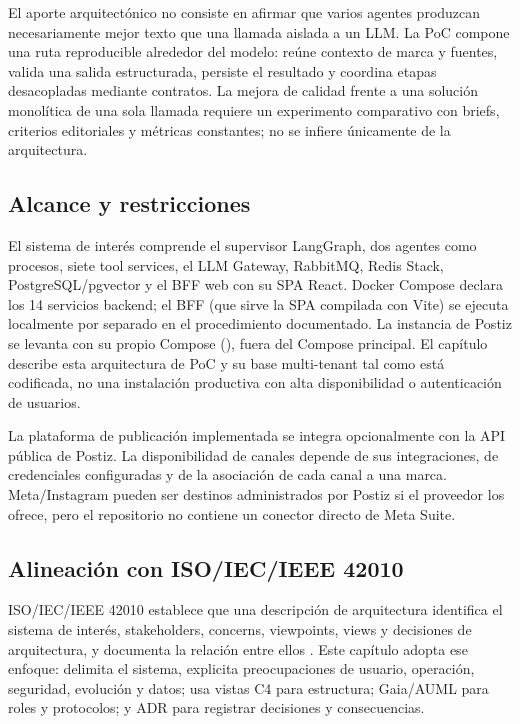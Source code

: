\documentclass[12pt,oneside]{report}
\newcommand{\code}[1]{\texttt{\detokenize{#1}}}
\begin{document}
El aporte arquitectónico no consiste en afirmar que varios agentes produzcan necesariamente mejor texto que una llamada aislada a un LLM. La PoC compone una ruta reproducible alrededor del modelo: reúne contexto de marca y fuentes, valida una salida estructurada, persiste el resultado y coordina etapas desacopladas mediante contratos. La mejora de calidad frente a una solución monolítica de una sola llamada requiere un experimento comparativo con briefs, criterios editoriales y métricas constantes; no se infiere únicamente de la arquitectura.

\subsection{Alcance y restricciones}
El sistema de interés comprende el supervisor LangGraph, dos agentes como procesos, siete tool services, el LLM Gateway, RabbitMQ, Redis Stack, PostgreSQL/pgvector y el BFF web con su SPA React. Docker Compose declara los 14 servicios backend; el BFF (que sirve la SPA compilada con Vite) se ejecuta localmente por separado en el procedimiento documentado. La instancia de Postiz se levanta con su propio Compose (\code{postiz/postiz-docker-compose}), fuera del Compose principal. El capítulo describe esta arquitectura de PoC y su base multi-tenant tal como está codificada, no una instalación productiva con alta disponibilidad o autenticación de usuarios.

La plataforma de publicación implementada se integra opcionalmente con la API pública de Postiz. La disponibilidad de canales depende de sus integraciones, de credenciales configuradas y de la asociación de cada canal a una marca. Meta/Instagram pueden ser destinos administrados por Postiz si el proveedor los ofrece, pero el repositorio no contiene un conector directo de Meta Suite.

\subsection{Alineación con ISO/IEC/IEEE 42010}
ISO/IEC/IEEE 42010 establece que una descripción de arquitectura identifica el sistema de interés, stakeholders, concerns, viewpoints, views y decisiones de arquitectura, y documenta la relación entre ellos \cite{iso42010}. Este capítulo adopta ese enfoque: delimita el sistema, explicita preocupaciones de usuario, operación, seguridad, evolución y datos; usa vistas C4 para estructura; Gaia/AUML para roles y protocolos; y ADR para registrar decisiones y consecuencias.
\end{document}
